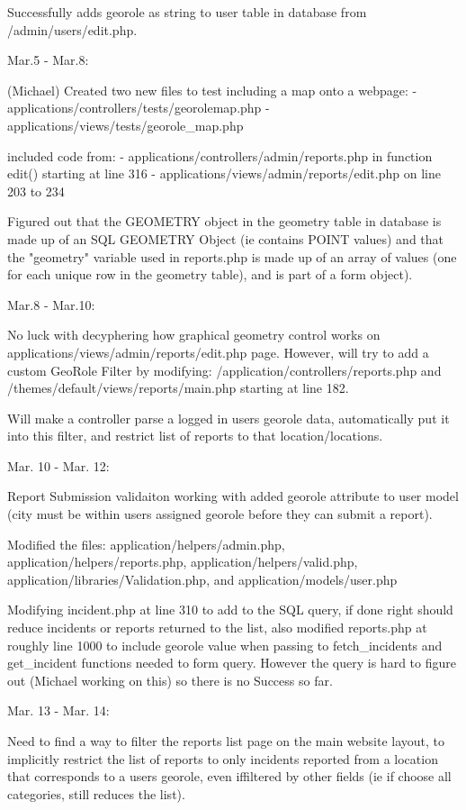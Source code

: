 \documentclass{article}
\begin{document}
    Successfully adds georole as string to user table in database from /admin/users/edit.php.

Mar.5 - Mar.8:
    
    (Michael) Created two new files to test including a map onto a webpage:
       - applications/controllers/tests/georolemap.php
       - applications/views/tests/georole_map.php
        
    included code from:
       - applications/controllers/admin/reports.php in function edit() starting at line 316
       - applications/views/admin/reports/edit.php on line 203 to 234
        
    Figured out that the GEOMETRY object in the geometry table in database is made up of an SQL GEOMETRY Object (ie contains POINT values) and that the "geometry" variable used in reports.php is made up of an array of values (one for each unique row in the geometry table), and is part of a form object).

Mar.8 - Mar.10:

    No luck with decyphering how graphical geometry control works on applications/views/admin/reports/edit.php page. However, will try to add a custom GeoRole Filter by modifying: /application/controllers/reports.php and /themes/default/views/reports/main.php starting at line 182.

    Will make a controller parse a logged in users georole data, automatically put it into this filter, and restrict list of reports to that location/locations.

Mar. 10 - Mar. 12:

    Report Submission validaiton working with added georole attribute to user model (city must be within users assigned georole before they can submit a report).

    Modified the files: application/helpers/admin.php, application/helpers/reports.php, application/helpers/valid.php, application/libraries/Validation.php, and application/models/user.php
 	   
    Modifying incident.php at line 310 to add to the SQL query, if done right should reduce incidents or reports returned to the list, also modified reports.php at roughly line 1000 to include georole value when passing to fetch_incidents and get_incident functions needed to form query.  However the query is hard to figure out (Michael working on this) so there is no Success so far.
 	     
Mar. 13 - Mar. 14:
            
    Need to find a way to filter the reports list page on the main website layout, to implicitly restrict the list of reports to only incidents reported from a location that corresponds to a users georole, even iffiltered by other fields (ie if choose all categories, still reduces the list).
         
\end{document}
